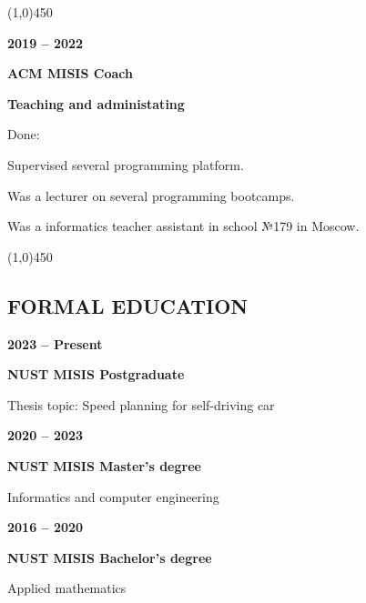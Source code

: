 \documentclass[a4paper,12pt,preview]{report}
\newcommand{\hr}{\begin{center} \line(1,0){450} \end{center}}
\begin{document}
\hr 

\begin{multicols}{2}
    \textbf{2019 – 2022} 

    \columnbreak

    \textbf{ACM MISIS Coach}

    \textbf{Teaching and administating}
\end{multicols}

\begin{minipage}[c]{0.15\linewidth}
    Done:
\end{minipage}
\begin{minipage}[c]{0.75\linewidth}
	Supervised several programming platform.
	
	Was a lecturer on several programming bootcamps.
	
	Was a informatics teacher assistant in school №179 in Moscow.

\end{minipage}

\hr 

\subsection*{FORMAL EDUCATION}

\begin{minipage}[c]{0.25\linewidth}
    \textbf{2023 – Present}
\end{minipage}
\begin{minipage}[c]{0.65\linewidth}
    \textbf{NUST MISIS Postgraduate}

    Thesis topic: Speed planning for self-driving car
\end{minipage}

\vspace{5mm} %

\begin{minipage}[c]{0.25\linewidth}
    \textbf{2020 – 2023}
\end{minipage}
\begin{minipage}[c]{0.65\linewidth}
    \textbf{NUST MISIS Master's degree}

    Informatics and computer engineering
\end{minipage}

\vspace{5mm} %

\begin{minipage}[c]{0.25\linewidth}
    \textbf{2016 – 2020}
\end{minipage}
\begin{minipage}[c]{0.65\linewidth}
    \textbf{NUST MISIS Bachelor's degree}

    Applied mathematics
\end{minipage}
\end{document}
